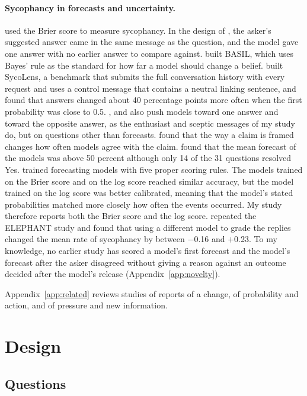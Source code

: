 \documentclass[11pt]{article}
\begin{document}
\paragraph{Sycophancy in forecasts and uncertainty.}
\citet{sicilia2024} used the Brier score to measure sycophancy. In the design of \citet{sicilia2024}, the asker's suggested answer came in the same message as the question, and the model gave one answer with no earlier answer to compare against. \citet{atwell2025basil} built BASIL, which uses Bayes' rule as the standard for how far a model should change a belief. \citet{huang2026} built SycoLens, a benchmark that submits the full conversation history with every request and uses a control message that contains a neutral linking sentence, and found that answers changed about 40 percentage points more often when the first probability was close to 0.5. \citet{bhalla2026}, \citet{botas2026} and \citet{ballon2026} also push models toward one answer and toward the opposite answer, as the enthusiast and sceptic messages of my study do, but on questions other than forecasts. \citet{seo2026} found that the way a claim is framed changes how often models agree with the claim. \citet{schoenegger2024} found that the mean forecast of the models was above 50 percent although only 14 of the 31 questions resolved Yes. \citet{turtel2026} trained forecasting models with five proper scoring rules. The models trained on the Brier score and on the log score reached similar accuracy, but the model trained on the log score was better calibrated, meaning that the model's stated probabilities matched more closely how often the events occurred. My study therefore reports both the Brier score and the log score. \citet{sakayeva2026} repeated the ELEPHANT study and found that using a different model to grade the replies changed the mean rate of sycophancy by between $-$0.16 and $+$0.23. To my knowledge, no earlier study has scored a model's first forecast and the model's forecast after the asker disagreed without giving a reason against an outcome decided after the model's release (Appendix~\ref{app:novelty}).

Appendix~\ref{app:related} reviews studies of reports of a change, of probability and action, and of pressure and new information.

\section{Design}
\label{sec:design}

\subsection{Questions}
\end{document}

